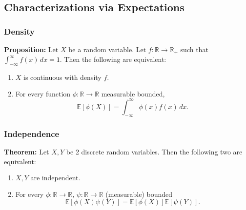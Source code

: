 \documentclass[a4paper]{extarticle}
\begin{document}
\subsection{Characterizations via Expectations}

\subsubsection{Density}

\begin{cbox}
    \textbf{Proposition:} Let \(X\) be a random variable. Let \(f : \mathbb{R} \to \mathbb{R}_+\) such that \(\int_{- \infty}^{\infty} f(x) \, dx = 1\). Then the following are equivalent:
    \begin{enumerate}
        \item \(X\) is continuous with density \(f\).
        \item For every function \(\phi : \mathbb{R} \to \mathbb{R}\) measurable bounded,
        \[
            \mathbb{E}[\phi(X)] = \int_{- \infty}^{\infty}\phi(x) f(x) \, dx.
        \]
    \end{enumerate}
\end{cbox}

\subsubsection{Independence}

\begin{tbox}
    \textbf{Theorem:} Let \(X,Y\) be 2 discrete random variables. Then the following two are equivalent:
    \begin{enumerate}
        \item \(X,Y\) are independent.
        \item For every \(\phi : \mathbb{R} \to \mathbb{R}, \, \psi : \mathbb{R} \to \mathbb{R}\) (measurable) bounded
        \[
            \mathbb{E}[\phi(X)\psi(Y)] = \mathbb{E}[\phi(X)]\mathbb{E}[\psi(Y)].
        \]
    \end{enumerate}
\end{tbox}
\end{document}
